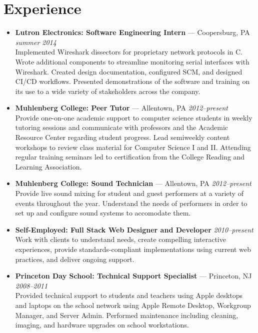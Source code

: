 \documentclass[11pt]{article}
\begin{document}
\section*{Experience}
\begin{itemize}
  \item \textbf{Lutron Electronics: Software Engineering Intern} --- Coopersburg, PA \hfill {\em summer 2014} \\
    Implemented Wireshark dissectors for proprietary network protocols in C. Wrote additional components to streamline monitoring serial interfaces with Wireshark. Created design documentation, configured SCM, and designed CI/CD workflows. Presented demonstrations of the software and training on its use to a wide variety of stakeholders across the company.

  \item \textbf{Muhlenberg College: Peer Tutor} --- Allentown, PA \hfill {\em 2012--present} \\
    Provide one-on-one academic support to computer science students in weekly tutoring sessions and communicate with professors and the Academic Resource Center regarding student progress. Lead semiweekly content workshops to review class material for Computer Science I and II. Attending regular training seminars led to certification from the College Reading and Learning Association.

  \item \textbf{Muhlenberg College: Sound Technician} --- Allentown, PA \hfill {\em 2012--present} \\
    Provide live sound mixing for student and guest performers at a variety of events throughout the year. Understand the needs of performers in order to set up and configure sound systems to accomodate them.

  \item \textbf{Self-Employed: Full Stack Web Designer and Developer} \hfill {\em 2010--present} \\
    Work with clients to understand needs, create compelling interactive experiences, provide standards-compliant implementations using current web practices, and deliver ongoing support.

  \item \textbf{Princeton Day School: Technical Support Specialist} --- Princeton, NJ \hfill {\em 2008--2011} \\
    Provided technical support to students and teachers using Apple desktops and laptops on the school network using Apple Remote Desktop, Workgroup Manager, and Server Admin. Performed maintenance including cleaning, imaging, and hardware upgrades on school workstations.
\end{itemize}
\end{document}
